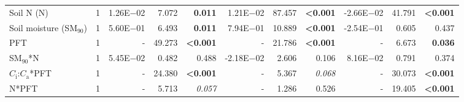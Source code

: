 \begin{landscape}
\begin{table}
{\begin{tabular}{p{3.75cm}p{0.5cm}p{1.75cm}p{1.5cm}p{1.5cm}p{1.75cm}p{1.5cm}p{1.5cm}p{1.75cm}p{1.5cm}p{1.5cm}}
            Soil N (N) & \multicolumn{1}{r}{1}
            & \multicolumn{1}{r}{1.26E$-$02}    & \multicolumn{1}{r}{7.072}         & \multicolumn{1}{r}{\textbf{0.011}}
            & \multicolumn{1}{r}{1.21E$-$02}    & \multicolumn{1}{r}{87.457}        & \multicolumn{1}{r}{\textbf{<0.001}}
            & \multicolumn{1}{r}{-2.66E$-$02}   & \multicolumn{1}{r}{41.791}        & \multicolumn{1}{r}{\textbf{<0.001}} 
            \\ %

            Soil moisture (SM$_{90}$) & \multicolumn{1}{r}{1}
            & \multicolumn{1}{r}{5.60E$-$01}      & \multicolumn{1}{r}{6.493}         & \multicolumn{1}{r}{\textbf{0.011}}
            & \multicolumn{1}{r}{7.94E$-$01}      & \multicolumn{1}{r}{10.889}        & \multicolumn{1}{r}{\textbf{<0.001}}
            & \multicolumn{1}{r}{-2.54E$-$01}     & \multicolumn{1}{r}{0.605}         & \multicolumn{1}{r}{0.437} 
            \\ %

            PFT & \multicolumn{1}{r}{1}
            & \multicolumn{1}{r}{-}             & \multicolumn{1}{r}{49.273}        & \multicolumn{1}{r}{\textbf{<0.001}}
            & \multicolumn{1}{r}{-}             & \multicolumn{1}{r}{21.786}        & \multicolumn{1}{r}{\textbf{<0.001}}
            & \multicolumn{1}{r}{-}             & \multicolumn{1}{r}{6.673}         & \multicolumn{1}{r}{\textbf{0.036}} 
            \\ %

            SM$_{90}$*N & \multicolumn{1}{r}{1}
            & \multicolumn{1}{r}{5.45E$-$02}     & \multicolumn{1}{r}{0.482}         & \multicolumn{1}{r}{0.488}
            & \multicolumn{1}{r}{-2.18E$-$02}     & \multicolumn{1}{r}{2.606}        & \multicolumn{1}{r}{0.106}
            & \multicolumn{1}{r}{8.16E$-$02}      & \multicolumn{1}{r}{0.791}        & \multicolumn{1}{r}{0.374} 
            \\ %

            $C_\mathrm{i}$:$C_\mathrm{a}$*PFT & \multicolumn{1}{r}{1}
            & \multicolumn{1}{r}{-}             & \multicolumn{1}{r}{24.380}        & \multicolumn{1}{r}{\textbf{<0.001}}
            & \multicolumn{1}{r}{-}             & \multicolumn{1}{r}{5.367}         & \multicolumn{1}{r}{\textit{ 0.068}}
            & \multicolumn{1}{r}{-}             & \multicolumn{1}{r}{30.073}        & \multicolumn{1}{r}{\textbf{<0.001}} 
            \\ %

            N*PFT & \multicolumn{1}{r}{1}
            & \multicolumn{1}{r}{-}             & \multicolumn{1}{r}{5.713}         & \multicolumn{1}{r}{\textit{0.057}}
            & \multicolumn{1}{r}{-}             & \multicolumn{1}{r}{1.286}         & \multicolumn{1}{r}{0.526}
            & \multicolumn{1}{r}{-}             & \multicolumn{1}{r}{19.405}         & \multicolumn{1}{r}{\textbf{<0.001}}
            \\ %


\end{tabular}}
\end{table}
\end{landscape}
